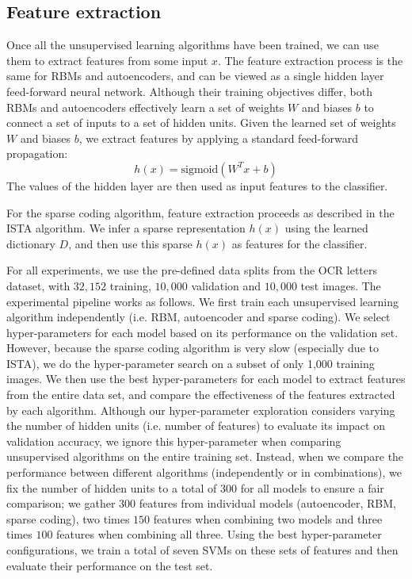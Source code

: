 \documentclass{article} %
\begin{document}
\subsection{Feature extraction}
Once all the unsupervised learning algorithms have been trained, we can use them to extract features from some input $x$. The feature extraction process is the same for RBMs and autoencoders, and can be viewed as a single hidden layer feed-forward neural network. Although their training objectives differ, both RBMs and autoencoders effectively learn a set of weights $W$ and biases $b$ to connect a set of inputs to a set of hidden units. Given the learned set of weights $W$ and biases $b$, we extract features by applying a standard feed-forward propagation:
\begin{equation}
h(x) = \text{sigmoid}(W^T x + b)
\end{equation}
The values of the hidden layer are then used as input features to the classifier.

For the sparse coding algorithm, feature extraction proceeds as described in the ISTA algorithm. We infer a sparse representation $h(x)$ using the learned dictionary $D$, and then use this sparse $h(x)$ as features for the classifier.

For all experiments, we use the pre-defined data splits from the OCR letters dataset, with $32,152$ training, $10,000$ validation and $10,000$ test images. The experimental pipeline works as follows. We first train each unsupervised learning algorithm independently (i.e. RBM, autoencoder and sparse coding). We select hyper-parameters for each model based on its performance on the validation set. However, because the sparse coding algorithm is very slow (especially due to ISTA), we do the hyper-parameter search on a subset of only 1,000 training images. We then use the best hyper-parameters for each model to extract features from the entire data set, and compare the effectiveness of the features extracted by each algorithm. Although our hyper-parameter exploration considers varying the number of hidden units (i.e. number of features) to evaluate its impact on validation accuracy, we ignore this hyper-parameter when comparing unsupervised algorithms on the entire training set. Instead, when we compare the performance between different algorithms (independently or in combinations), we fix the number of hidden units to a total of 300 for all models to ensure a fair comparison; we gather $300$ features from individual models (autoencoder, RBM, sparse coding), two times $150$ features when combining two models and three times $100$ features when combining all three. Using the best hyper-parameter configurations, we train a total of seven SVMs on these sets of features and then evaluate their performance on the test set.
\end{document}
